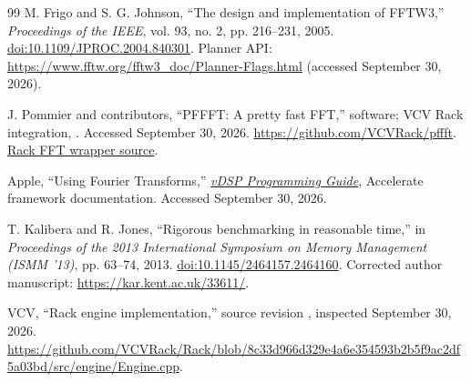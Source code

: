 \begin{thebibliography}{99}
M. Frigo and S. G. Johnson, ``The design and implementation of FFTW3,''
\emph{Proceedings of the IEEE}, vol. 93, no. 2, pp. 216--231, 2005.
\href{https://doi.org/10.1109/JPROC.2004.840301}{doi:10.1109/JPROC.2004.840301}.
Planner API: \url{https://www.fftw.org/fftw3_doc/Planner-Flags.html}
(accessed September 30, 2026).

J. Pommier and contributors, ``PFFFT: A pretty fast FFT,'' software;
VCV Rack integration, . Accessed September 30, 2026.
\url{https://github.com/VCVRack/pffft}.
\href{https://github.com/VCVRack/Rack/blob/v2/include/dsp/fft.hpp}{Rack FFT wrapper source}.

Apple, ``Using Fourier Transforms,''
\href{https://developer.apple.com/library/archive/documentation/Performance/Conceptual/vDSP_Programming_Guide/UsingFourierTransforms/UsingFourierTransforms.html}{\emph{vDSP Programming Guide}},
Accelerate framework documentation. Accessed September 30, 2026.

T. Kalibera and R. Jones, ``Rigorous benchmarking in reasonable time,'' in
\emph{Proceedings of the 2013 International Symposium on Memory Management
(ISMM '13)}, pp. 63--74, 2013.
\href{https://doi.org/10.1145/2464157.2464160}{doi:10.1145/2464157.2464160}.
Corrected author manuscript: \url{https://kar.kent.ac.uk/33611/}.

VCV, ``Rack engine implementation,'' source revision
, inspected September 30, 2026.
\url{https://github.com/VCVRack/Rack/blob/8c33d966d329e4a6e354593b2b5f9ac2df5a03bd/src/engine/Engine.cpp}.

\end{thebibliography}
